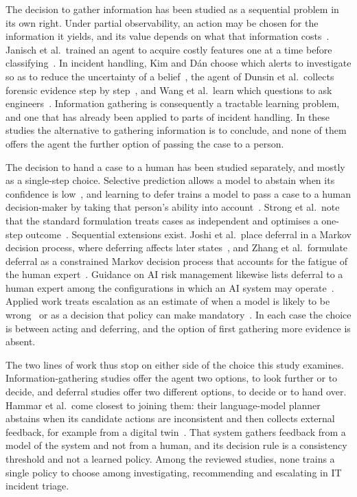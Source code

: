 \documentclass[12pt,a4paper]{article}
\begin{document}
The decision to gather information has been studied as a sequential problem in its own right. Under partial observability, an action may be chosen for the information it yields, and its value depends on what that information costs~\cite{kaelbling1998}. Janisch et al.\ trained an agent to acquire costly features one at a time before classifying~\cite{janisch2019}. In incident handling, Kim and D\'{a}n choose which alerts to investigate so as to reduce the uncertainty of a belief~\cite{kim2025}, the agent of Dunsin et al.\ collects forensic evidence step by step~\cite{dunsin2025}, and Wang et al.\ learn which questions to ask engineers~\cite{wang2023hrlhf}. Information gathering is consequently a tractable learning problem, and one that has already been applied to parts of incident handling. In these studies the alternative to gathering information is to conclude, and none of them offers the agent the further option of passing the case to a person.

The decision to hand a case to a human has been studied separately, and mostly as a single-step choice. Selective prediction allows a model to abstain when its confidence is low~\cite{geifman2019}, and learning to defer trains a model to pass a case to a human decision-maker by taking that person's ability into account~\cite{madras2018,hemmer2023}. Strong et al.\ note that the standard formulation treats cases as independent and optimises a one-step outcome~\cite{strong2025}. Sequential extensions exist. Joshi et al.\ place deferral in a Markov decision process, where deferring affects later states~\cite{joshi2023}, and Zhang et al.\ formulate deferral as a constrained Markov decision process that accounts for the fatigue of the human expert~\cite{zhang2026falcon}. Guidance on AI risk management likewise lists deferral to a human expert among the configurations in which an AI system may operate~\cite{nist2023}. Applied work treats escalation as an estimate of when a model is likely to be wrong~\cite{bachar2026} or as a decision that policy can make mandatory~\cite{pacella2026}. In each case the choice is between acting and deferring, and the option of first gathering more evidence is absent.

The two lines of work thus stop on either side of the choice this study examines. Information-gathering studies offer the agent two options, to look further or to decide, and deferral studies offer two different options, to decide or to hand over. Hammar et al.\ come closest to joining them: their language-model planner abstains when its candidate actions are inconsistent and then collects external feedback, for example from a digital twin~\cite{hammar2026llm}. That system gathers feedback from a model of the system and not from a human, and its decision rule is a consistency threshold and not a learned policy. Among the reviewed studies, none trains a single policy to choose among investigating, recommending and escalating in IT incident triage.
\end{document}
